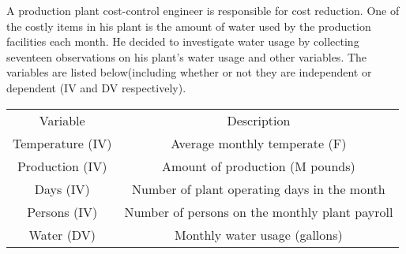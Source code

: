 \documentclass[12pt, a4paper]{article}
\theoremstyle{plain}
\theoremstyle{definition}
\theoremstyle{remark}
\begin{document}
A production plant cost-control engineer is responsible for cost reduction. One of the costly items in his plant is the amount of water used by the production facilities each month. He decided to investigate water usage by collecting seventeen observations on his plant's water usage and other variables. The variables are listed below(including whether or not they are independent or dependent (IV and DV respectively).
\begin{center}
\begin{tabular}{|c|c|}
  \hline
Variable	&	Description \\
Temperature (IV)	&	Average monthly temperate (F)\\
Production (IV)	&	Amount of production (M pounds)\\
Days	(IV) &	Number of plant operating days in the month\\
Persons	(IV) &	Number of persons on the monthly plant payroll\\
Water (DV)	&	Monthly water usage (gallons)\\
  \hline
\end{tabular}
\end{center}
\newpage
\end{document}
